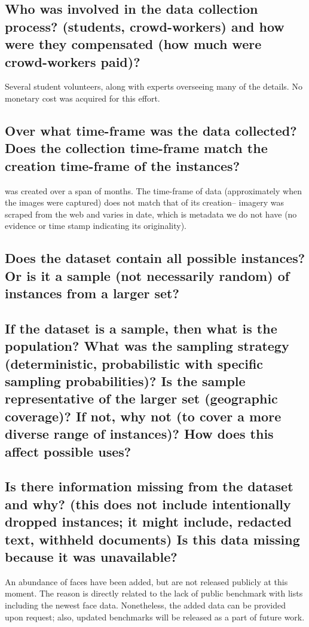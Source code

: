 \subsection*{Who was involved in the data collection process? (\eg students, crowd-workers) and how were they compensated (\eg how much were crowd-workers paid)?}
\noindent Several student volunteers, along with experts overseeing many of the details. No monetary cost was acquired for this effort.

\subsection*{Over what time-frame was the data collected? Does the collection time-frame match the creation time-frame of the instances?}
\noindent
{} was created over a span of months. The time-frame of data (\ie approximately when the images were captured) does not match that of its creation-- imagery was scraped from the web and varies in date, which is metadata we do not have (\ie no evidence or time stamp indicating its originality).


\subsection*{Does the dataset contain all possible instances? Or is it a sample (not necessarily random) of instances from a larger set?}
\noindent
\subsection*{If the dataset is a sample, then what is the population? What was the sampling strategy (\eg deterministic, probabilistic with specific sampling probabilities)? Is the sample representative of the larger set (\eg geographic coverage)? If not, why not (\eg to cover a more diverse range of instances)? How does this affect possible uses?}
\noindent
\subsection*{Is there information missing from the dataset and why? (this does not include intentionally dropped instances; it might include, \eg redacted text, withheld documents) Is this data missing because it was unavailable?}
\noindent
An abundance of faces have been added, but are not released publicly at this moment. The reason is directly related to the lack of public benchmark with lists including the newest face data. Nonetheless, the added data can be provided upon request; also, updated benchmarks will be released as a part of future work.


